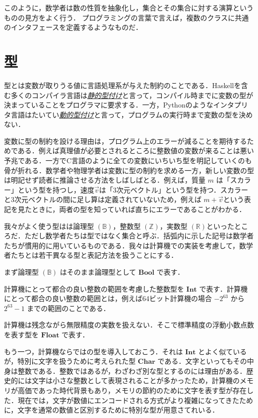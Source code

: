 \documentclass[a4paper]{jsbook}
\newcommand{\programminglanguage}[1]{\textsf{#1}}
\newcommand{\clang}{\programminglanguage{C}}
\newcommand{\haskell}{\programminglanguage{Haskell}}
\newcommand{\python}{\programminglanguage{Python}}
\newcommand{\keyword}[1]{{\underline{\emph{#1}}}}
\newcommand{\mSpecialSet}[1]{\mathbb{#1}} %
\newcommand{\mRSet}{\mSpecialSet{R}}
\newcommand{\mZSet}{\mSpecialSet{Z}}
\newcommand{\mBSet}{\mSpecialSet{B}}
\newcommand{\mType}[1]{\mathbf{#1}}
\newcommand{\mBoolType}{\mType{Bool}}
\newcommand{\mCharType}{\mType{Char}}
\newcommand{\mIntType}{\mType{Int}}
\newcommand{\mFloatType}{\mType{Float}}
\begin{document}
このように，数学者は数の性質を抽象化し，集合とその集合に対する演算というものの見方をよく行う．
プログラミングの言葉で言えば，複数のクラスに共通のインタフェースを定義するようなものだ．

\section{型}

型とは変数が取りうる値に言語処理系が与えた制約のことである．\haskell を含む多くのコンパイラ言語は\keyword{静的型付け}と言って，コンパイル時までに変数の型が決まっていることをプログラマに要求する．一方，\python のようなインタプリタ言語はたいてい\keyword{動的型付け}と言って，プログラムの実行時まで変数の型を決めない．

変数に型の制約を設ける理由は，プログラム上のエラーが減ることを期待するためである．例えば真理値が必要とされるところに整数値の変数が来ることは悪い予兆である．一方で\clang 言語のように全ての変数にいちいち型を明記していくのも骨が折れる．数学者や物理学者は変数に型の制約を求める一方，新しい変数の型は明記せず読者に推論させる方法をしばしばとる．例えば，質量 $m$ は「スカラー」という型を持つし，速度$\vec{v}$は「3次元ベクトル」という型を持つ．スカラーと3次元ベクトルの間に足し算は定義されていないため，例えば $m+\vec{v}$という表記を見たときに，両者の型を知っていれば直ちにエラーであることがわかる．

我々がよく使う型はは論理型 $(\mBSet)$，整数型 $(\mZSet)$，実数型 $(\mRSet)$といったところだ．ただし数学者たちは型ではなく集合と呼ぶ．括弧内に示した記号は数学者たちが慣用的に用いているものである．我々は計算機での実装を考慮して，数学者たちとは若干異なる型と表記方法を扱うことにする．

まず論理型 $(\mBSet)$ はそのまま論理型として $\mBoolType$ で表す．

計算機にとって都合の良い整数の範囲を考慮した整数型を $\mIntType$ で表す．計算機にとって都合の良い整数の範囲とは，例えば64ビット計算機の場合 $-2^{63}$ から $2^{63}-1$ までの範囲のことである．

計算機は残念ながら無限精度の実数を扱えない．そこで標準精度の浮動小数点数を表す型を $\mFloatType$ で表す．

もう一つ，計算機ならではの型を導入しておこう．それは $\mIntType$ とよく似ているが，特別に文字を扱うために考えられた型 $\mCharType$ である．文字といってもその中身は整数である．整数ではあるが，わざわざ別な型とするのには理由がある．歴史的には文字は小さな整数として表現されることが多かったため，計算機のメモリが高価であった時代背景もあり，メモリの節約のために文字を表す型が存在した．現在では，文字が数値にエンコードされる方式がより複雑になってきたために，文字を通常の数値と区別するために特別な型が用意さてれいる．
\end{document}
